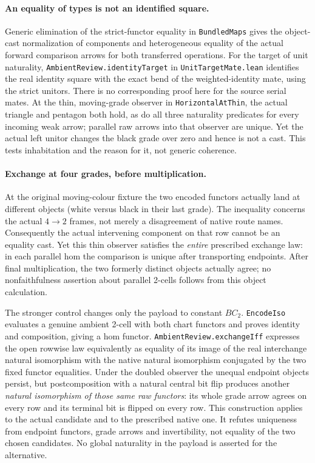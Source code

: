 \documentclass[11pt]{article}
\newcommand{\code}{\nolinkurl}
\begin{document}
\paragraph{An equality of types is not an identified square.} Generic elimination of the strict-functor equality in \code{BundledMaps} gives the object-cast normalization of components and heterogeneous equality of the actual forward comparison arrows for both transferred operations. For the target of unit naturality, \code{AmbientReview.identityTarget} in \code{UnitTargetMate.lean} identifies the real identity square with the exact bend of the weighted-identity mate, using the strict unitors. There is no corresponding proof here for the source serial mates. At the thin, moving-grade observer in \code{HorizontalAtThin}, the actual triangle and pentagon both hold, as do all three naturality predicates for every incoming weak arrow; parallel raw arrows into that observer are unique. Yet the actual left unitor changes the black grade over zero and hence is not a cast. This tests inhabitation and the reason for it, not generic coherence.

\paragraph{Exchange at four grades, before multiplication.} At the original moving-colour fixture the two encoded functors actually land at different objects (white versus black in their last grade). The inequality concerns the actual $4\to2$ frames, not merely a disagreement of native route names. Consequently the actual intervening component on that row cannot be an equality cast. Yet this thin observer satisfies the \emph{entire} prescribed exchange law: in each parallel hom the comparison is unique after transporting endpoints. After final multiplication, the two formerly distinct objects actually agree; no nonfaithfulness assertion about parallel 2-cells follows from this object calculation.

The stronger control changes only the payload to constant $BC_2$. \code{EncodeIso} evaluates a genuine ambient 2-cell with both chart functors and proves identity and composition, giving a hom functor. \code{AmbientReview.exchangeIff} expresses the open rowwise law equivalently as equality of its image of the real interchange natural isomorphism with the native natural isomorphism conjugated by the two fixed functor equalities. Under the doubled observer the unequal endpoint objects persist, but postcomposition with a natural central bit flip produces another \emph{natural isomorphism of those same raw functors}: its whole grade arrow agrees on every row and its terminal bit is flipped on every row. This construction applies to the actual candidate and to the prescribed native one. It refutes uniqueness from endpoint functors, grade arrows and invertibility, not equality of the two chosen candidates. No global naturality in the payload is asserted for the alternative.
\end{document}
